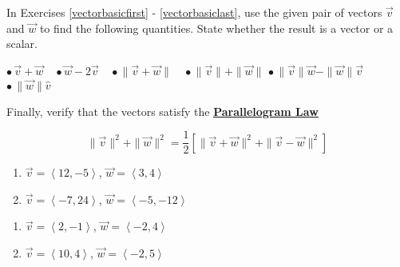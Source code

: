 In Exercises \ref{vectorbasicfirst} - \ref{vectorbasiclast}, use the given pair of vectors $\vec{v}$ and $\vec{w}$ to find the following quantities.  State whether the result is a vector or a scalar.  

\medskip

\hspace{.15in} $\bullet \, \vec{v} + \vec{w} \;\;\;$ \hfill $\bullet \, \vec{w}  - 2\vec{v} \;\;\;$ \hfill $\bullet \, \| \vec{v} + \vec{w} \| \;\;\;$ \hfill $\bullet \, \| \vec{v} \| + \| \vec{w} \|$ \hfill $\bullet \, \| \vec{v} \| \vec{w} - \| \vec{w} \| \vec{v}$ \hfill $\bullet \, \|\vec{w}\| \hat{v}$

\medskip

Finally, verify that the vectors satisfy the \href{http://en.wikipedia.org/wiki/Parallelogram_law}{\underline{\textbf{Parallelogram Law}}}

\[ \|\vec{v}\|^2 + \|\vec{w}\|^2 = \dfrac{1}{2}\left[ \| \vec{v} + \vec{w}\|^2 + \|\vec{v} - \vec{w}\|^2\right] \]

\begin{multicols}{2}

\begin{enumerate}

\item  $\vec{v} = \left<12, -5\right>$, $\vec{w} = \left<3, 4\right>$ \label{vectorbasicfirst}
\item $\vec{v} = \left<-7, 24 \right>$, $\vec{w} = \left<-5, -12\right>$

\setcounter{HW}{\value{enumi}}

\end{enumerate}

\end{multicols}

\begin{multicols}{2}

\begin{enumerate}

\setcounter{enumi}{\value{HW}}

\item $\vec{v} = \left<2, -1 \right>$, $\vec{w} = \left<-2, 4 \right>$
\item $\vec{v} = \left<10, 4 \right>$, $\vec{w} = \left<-2, 5 \right>$

\setcounter{HW}{\value{enumi}}

\end{enumerate}

\end{multicols}

